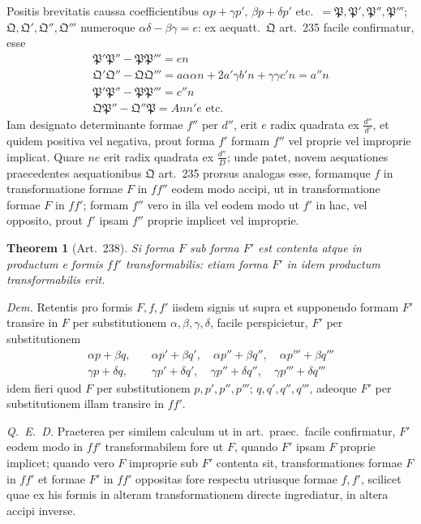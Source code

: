 \documentclass[12pt,a4paper]{article}
\theoremstyle{plain}
\newtheorem{theorem}{Theorem}[section]
\theoremstyle{definition}
\theoremstyle{remark}
\theoremstyle{problemstyle}
\begin{document}
Positis brevitatis caussa coefficientibus $\alpha p + \gamma p'$, $\beta p + \delta p'$ etc.\ $= \mathfrak{P}, \mathfrak{P}', \mathfrak{P}'', \mathfrak{P}'''$; $\mathfrak{Q}, \mathfrak{Q}', \mathfrak{Q}'', \mathfrak{Q}'''$ numeroque $\alpha\delta - \beta\gamma = e$: ex aequatt.\ $\mathfrak{Q}$ art.\ 235 facile confirmatur, esse
\begin{gather*}
\mathfrak{P}'\mathfrak{P}'' - \mathfrak{P}\mathfrak{P}''' = en \\
\mathfrak{Q}'\mathfrak{Q}'' - \mathfrak{Q}\mathfrak{Q}''' = a\alpha\alpha n + 2a'\gamma b'n + \gamma\gamma c'n = a''n \\
\mathfrak{P}'\mathfrak{P}'' - \mathfrak{P}\mathfrak{P}''' = c''n \\
\mathfrak{Q}\mathfrak{P}'' - \mathfrak{Q}''\mathfrak{P} = Ann'e \text{ etc.}
\end{gather*}
Iam designato determinante formae $f''$ per $d''$, erit $e$ radix quadrata ex $\frac{d''}{d'}$, et quidem positiva vel negativa, prout forma $f'$ formam $f''$ vel proprie vel improprie implicat. Quare $ne$ erit radix quadrata ex $\frac{d''}{D}$; unde patet, novem aequationes praecedentes aequationibus $\mathfrak{Q}$ art.\ 235 prorsus analogas esse, formamque $f$ in transformatione formae $F$ in $ff''$ eodem modo accipi, ut in transformatione formae $F$ in $ff'$; formam $f''$ vero in illa vel eodem modo ut $f'$ in hac, vel opposito, prout $f'$ ipsam $f''$ proprie implicet vel improprie.


\begin{theorem}[Art.\ 238]
Si forma $F$ sub forma $F'$ est contenta atque in productum e formis $ff'$ transformabilis: etiam forma $F'$ in idem productum transformabilis erit.
\end{theorem}

\emph{Dem.} Retentis pro formis $F, f, f'$ iisdem signis ut supra et supponendo formam $F'$ transire in $F$ per substitutionem $\alpha, \beta, \gamma, \delta$, facile perspicietur, $F'$ per substitutionem
\begin{align*}
\alpha p + \beta q, &\quad \alpha p' + \beta q', \quad \alpha p'' + \beta q'', \quad \alpha p''' + \beta q''' \\
\gamma p + \delta q, &\quad \gamma p' + \delta q', \quad \gamma p'' + \delta q'', \quad \gamma p''' + \delta q'''
\end{align*}
idem fieri quod $F$ per substitutionem $p, p', p'', p'''$; $q, q', q'', q'''$, adeoque $F'$ per substitutionem illam transire in $ff'$.

\emph{Q.\ E.\ D.} Praeterea per similem calculum ut in art.\ praec.\ facile confirmatur, $F'$ eodem modo in $ff'$ transformabilem fore ut $F$, quando $F'$ ipsam $F$ proprie implicet; quando vero $F$ improprie sub $F'$ contenta sit, transformationes formae $F$ in $ff'$ et formae $F'$ in $ff'$ oppositas fore respectu utriusque formae $f, f'$, scilicet quae ex his formis in alteram transformationem directe ingrediatur, in altera accipi inverse.
\end{document}
